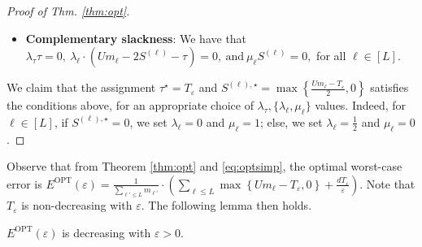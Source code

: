 \begin{proof}[Proof of Thm. \ref{thm:opt}]
\begin{itemize}
\item \textbf{Complementary slackness}: We have that $	\lambda_\tau \tau= 0,\ \lambda_\ell\cdot \left(Um_\ell-2S^{(\ell)}-\tau\right) = 0,\ \text{and}\ \mu_\ell S^{(\ell)} = 0,$
for all $\ell\in [L]$.
\end{itemize}
We claim that the assignment $\tau^\star = T_\varepsilon$ and $S^{(\ell),\star} = \max\left\{\frac{Um_\ell-T_\varepsilon}{2},0\right\}$ satisfies the conditions above, for an appropriate choice of $\lambda_\tau,\{\lambda_\ell,\mu_\ell\}$ values. Indeed, for $\ell\in [L]$, if $S^{(\ell),\star} = 0$, we set $\lambda_\ell = 0$ and $\mu_\ell = 1$; else, we set $\lambda_\ell = \frac12$ and $\mu_\ell = 0$. 
\end{proof}
Observe that from Theorem \ref{thm:opt} and \eqref{eq:optsimp}, the optimal worst-case error is $E^\text{OPT}(\varepsilon)= \frac{1}{\sum_{\ell'\leq L} m_{\ell'}}\cdot\left(\sum_{\ell\leq L} \max\left\{{Um_\ell-T_\varepsilon},0\right\}+\frac{dT_\varepsilon}{\varepsilon}\right).$ %
Note that $T_\varepsilon$ is non-decreasing with $\varepsilon$. The following lemma then holds.
\begin{lemma}
\label{lem:monotonicity}
$E^\text{OPT}(\varepsilon)$ is decreasing with $\varepsilon>0$.
\end{lemma}
